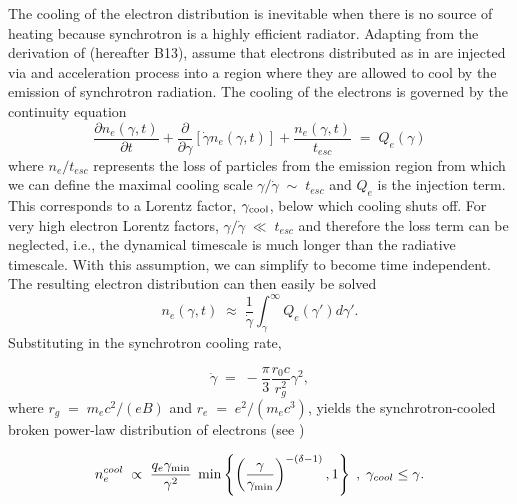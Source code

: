 The cooling of the electron distribution is inevitable when there is
no source of heating because synchrotron is a highly efficient
radiator. Adapting from the derivation of \cite{Burgess:2013}
(hereafter B13), assume that electrons distributed as in
 are injected via and acceleration process into
a region where they are allowed to cool by the emission of synchrotron
radiation. The cooling of the electrons is governed by the continuity
equation \cite{Blumenthal:1970}
\begin{equation}
  \label{eq:komp}
  \frac{\partial n_e(\gamma,t)}{\partial t}+\frac{\partial}{\partial \gamma}[\dot{\gamma}n_e(\gamma,t)]+\frac{n_e(\gamma,t)}{t_{esc}}\;=\;Q_e(\gamma)
\end{equation}
where $n_e/t_{esc}$ represents the loss of particles from the emission
region from which we can define the maximal cooling scale
$\gamma/\dot{\gamma}\;\sim\;t_{esc}$ and $Q_e$ is the injection term. This corresponds to a Lorentz
factor, $\gamma_{\rm cool}$, below which cooling shuts off. For very high
electron Lorentz factors, $\gamma/\dot{\gamma}\;\ll\;t_{esc}$ and
therefore the loss term can be neglected, i.e., the dynamical
timescale is much longer than the radiative timescale. With this
assumption, we can simplify  to become
time independent. The resulting electron distribution can then easily
be solved
\begin{equation}
  \label{eq:simpKomp}
  n_e(\gamma,t)\;\approx\;\frac{1}{\dot{\gamma}}\int_{\gamma}^{\infty}Q_e(\gamma')d\gamma'.
\end{equation}
Substituting in the synchrotron cooling rate,

\begin{equation}
  \label{synchCool}
  \dot{\gamma}\;=\;-\frac{\pi}{3}\frac{r_0c}{r_g^2}\gamma^2,
\end{equation}
where $r_g\;=\;m_ec^2/(eB)$ and $r_e\;=\;e^2/(m_ec^3)$,  yields the synchrotron-cooled broken
power-law distribution of electrons (see )

\begin{equation}
  \label{eq:necool}
  n_e^{cool}\;\propto\;\frac{q_e\gamma_{\rm min}}{\gamma^2}\;\min\left\{\left(\frac{\gamma}{\gamma_{\rm min}}\right)^{-(\delta-1)},1\right\}\;,\;\gamma_{cool}\leq\gamma.
\end{equation}

